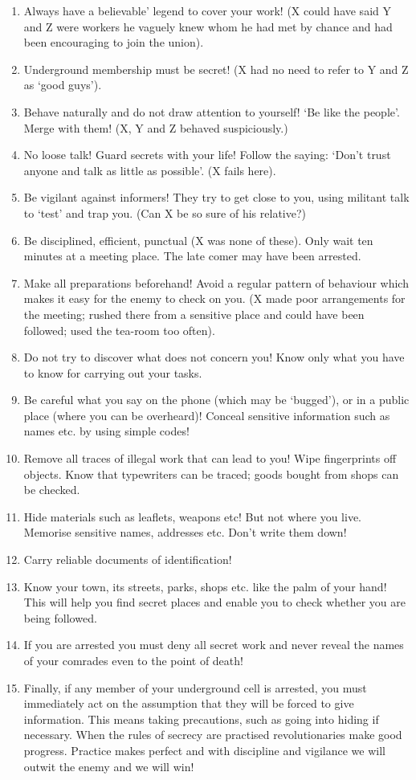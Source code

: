 \begin{enumerate}
\tightlist
\item
  Always have a believable' legend to cover your work! (X could have
  said Y and Z were workers he vaguely knew whom he had met by chance
  and had been encouraging to join the union).
\item
  Underground membership must be secret! (X had no need to refer to Y
  and Z as `good guys').
\item
  Behave naturally and do not draw attention to yourself! `Be like the
  people'. Merge with them! (X, Y and Z behaved suspiciously.)
\item
  No loose talk! Guard secrets with your life! Follow the saying: `Don't
  trust anyone and talk as little as possible'. (X fails here).
\item
  Be vigilant against informers! They try to get close to you, using
  militant talk to `test' and trap you. (Can X be so sure of his
  relative?)
\item
  Be disciplined, efficient, punctual (X was none of these). Only wait
  ten minutes at a meeting place. The late comer may have been arrested.
\item
  Make all preparations beforehand! Avoid a regular pattern of behaviour
  which makes it easy for the enemy to check on you. (X made poor
  arrangements for the meeting; rushed there from a sensitive place and
  could have been followed; used the tea-room too often).
\item
  Do not try to discover what does not concern you! Know only what you
  have to know for carrying out your tasks.
\item
  Be careful what you say on the phone (which may be `bugged'), or in a
  public place (where you can be overheard)! Conceal sensitive
  information such as names etc. by using simple codes!
\item
  Remove all traces of illegal work that can lead to you! Wipe
  fingerprints off objects. Know that typewriters can be traced; goods
  bought from shops can be checked.
\item
  Hide materials such as leaflets, weapons etc! But not where you live.
  Memorise sensitive names, addresses etc. Don't write them down!
\item
  Carry reliable documents of identification!
\item
  Know your town, its streets, parks, shops etc. like the palm of your
  hand! This will help you find secret places and enable you to check
  whether you are being followed.
\item
  If you are arrested you must deny all secret work and never reveal the
  names of your comrades even to the point of death!
\item
  Finally, if any member of your underground cell is arrested, you must
  immediately act on the assumption that they will be forced to give
  information. This means taking precautions, such as going into hiding
  if necessary. When the rules of secrecy are practised revolutionaries
  make good progress. Practice makes perfect and with discipline and
  vigilance we will outwit the enemy and we will win!
\end{enumerate}

